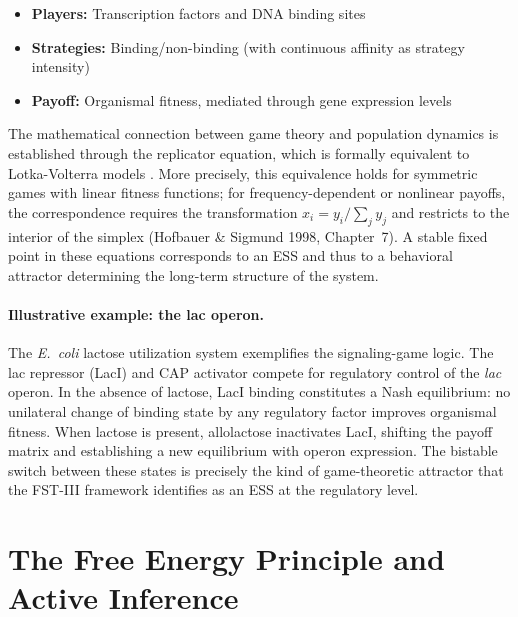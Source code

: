 \documentclass[12pt,a4paper]{article}
\theoremstyle{remark}
\begin{document}
\begin{itemize}
    \item \textbf{Players:} Transcription factors and DNA binding sites
    \item \textbf{Strategies:} Binding/non-binding (with continuous affinity as strategy intensity)
    \item \textbf{Payoff:} Organismal fitness, mediated through gene expression levels
\end{itemize}

The mathematical connection between game theory and population dynamics is established through the replicator equation, which is formally equivalent to Lotka-Volterra models \citep{HofbauerSigmund1998}. More precisely, this equivalence holds for symmetric games with linear fitness functions; for frequency-dependent or nonlinear payoffs, the correspondence requires the transformation $x_i = y_i / \sum_j y_j$ and restricts to the interior of the simplex (Hofbauer \& Sigmund 1998, Chapter~7). A stable fixed point in these equations corresponds to an ESS and thus to a behavioral attractor determining the long-term structure of the system.

\paragraph{Illustrative example: the lac operon.}
The \textit{E.\ coli} lactose utilization system exemplifies the signaling-game logic. The lac repressor (LacI) and CAP activator compete for regulatory control of the \textit{lac} operon. In the absence of lactose, LacI binding constitutes a Nash equilibrium: no unilateral change of binding state by any regulatory factor improves organismal fitness. When lactose is present, allolactose inactivates LacI, shifting the payoff matrix and establishing a new equilibrium with operon expression. The bistable switch between these states is precisely the kind of game-theoretic attractor that the FST-III framework identifies as an ESS at the regulatory level.

\section{The Free Energy Principle and Active Inference}
\label{sec:fep}
\end{document}
